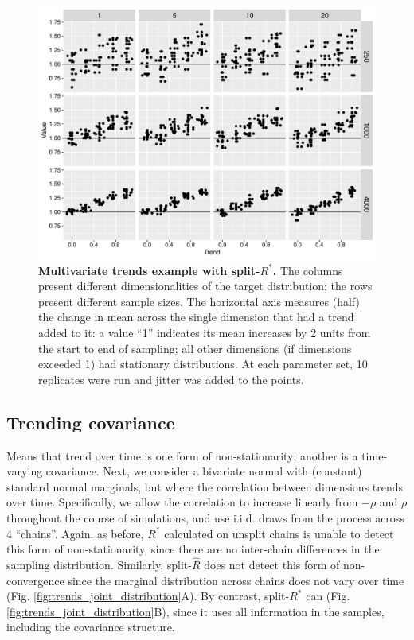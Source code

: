 \documentclass{article}
\begin{document}
\begin{figure}[!htb]
	\centerline{\includegraphics[width=1.0\textwidth]{../output/trends_one_dim.pdf}}
	\caption{\textbf{Multivariate trends example with split-$R^*$.} The columns present different dimensionalities of the target distribution; the rows present different sample sizes. The horizontal axis measures (half) the change in mean across the single dimension that had a trend added to it: a value ``1'' indicates its mean increases by 2 units from the start to end of sampling; all other dimensions (if dimensions exceeded 1) had stationary distributions. At each parameter set, 10 replicates were run and jitter was added to the points.}
	\label{fig:trends_one_dim}
\end{figure}

\subsection{Trending covariance}\label{sec:non-stationary_covariance}
Means that trend over time is one form of non-stationarity; another is a time-varying covariance. Next, we consider a bivariate normal with (constant) standard normal marginals, but where the correlation between dimensions trends over time. Specifically, we allow the correlation to increase linearly from $-\rho$ and $\rho$ throughout the course of simulations, and use i.i.d. draws from the process across 4 ``chains''. Again, as before, $R^*$ calculated on unsplit chains is unable to detect this form of non-stationarity, since there are no inter-chain differences in the sampling distribution. Similarly, split-$\widehat{R}$ does not detect this form of non-convergence since the marginal distribution across chains does not vary over time (Fig. \ref{fig:trends_joint_distribution}A). By contrast, split-$R^*$ can (Fig. \ref{fig:trends_joint_distribution}B), since it uses all information in the samples, including the covariance structure.
\end{document}

